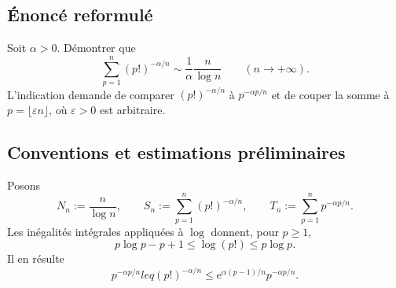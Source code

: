 \documentclass[11pt,a4paper]{article}
\newcommand{\eps}{\varepsilon}
\newcommand{\e}{\mathrm e}
\begin{document}
\subsection{\'Enonc\'e reformul\'e}
\begin{theorembox}
Soit $\alpha>0$. D\'emontrer que
\[
 \sum_{p=1}^{n}(p!)^{-\alpha/n}
 \sim\frac1\alpha\frac{n}{\log n}
 \qquad(n\to+\infty).
\]
L'indication demande de comparer $(p!)^{-\alpha/n}$ \`a $p^{-\alpha p/n}$ et
de couper la somme \`a $p=\lfloor\eps n\rfloor$, o\`u $\eps>0$ est arbitraire.
\end{theorembox}

\subsection{Conventions et estimations pr\'eliminaires}
Posons
\[
 N_n:=\frac{n}{\log n},\qquad
 S_n:=\sum_{p=1}^{n}(p!)^{-\alpha/n},\qquad
 T_n:=\sum_{p=1}^{n}p^{-\alpha p/n}.
\]
Les in\'egalit\'es int\'egrales appliqu\'ees \`a $\log$ donnent, pour $p\geq1$,
\begin{equation}
 p\log p-p+1\leq\log(p!)\leq p\log p. \tag{4}
\end{equation}
Il en r\'esulte
\begin{equation}
 p^{-\alpha p/n}leq(p!)^{-\alpha/n}
 \leq \e^{\alpha(p-1)/n}p^{-\alpha p/n}. \tag{5}
\end{equation}
\end{document}
